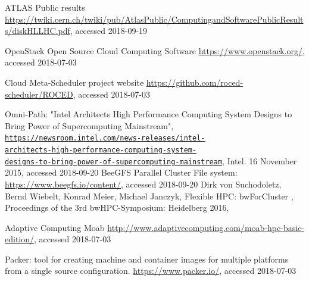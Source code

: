 
\begin{thebibliography}{}
%
%
  ATLAS Public results
  \url{https://twiki.cern.ch/twiki/pub/AtlasPublic/ComputingandSoftwarePublicResults/diskHLLHC.pdf},
  accessed 2018-09-19

OpenStack Open Source Cloud Computing Software
\url{https://www.openstack.org/}, accessed 2018-07-03

\Roced Cloud Meta-Scheduler project website
\url{https://github.com/roced-scheduler/ROCED}, accessed 2018-07-03

  Omni-Path:
"Intel Architects High Performance Computing System Designs to Bring
Power of Supercomputing Mainstream",
\texttt{\href{https://newsroom.intel.com/news-releases/intel-architects-high-performance-computing-system-designs-to-bring-power-of-supercomputing-mainstream/}{https://newsroom.intel.com/news-releases/intel-\\architects-high-performance-computing-system-\\designs-to-bring-power-of-supercomputing-mainstream}},
Intel. 16 November 2015, accessed 2018-09-20
BeeGFS Parallel Cluster File system:
\url{https://www.beegfs.io/content/}, accessed 2018-09-20
Dirk von Suchodoletz, Bernd Wiebelt, Konrad Meier, Michael Janczyk,
  Flexible HPC: bwForCluster \NEMO,
  Proceedings of the 3rd bwHPC-Symposium: Heidelberg 2016,




Adaptive Computing Moab
\url{http://www.adaptivecomputing.com/moab-hpc-basic-edition/}, accessed 2018-07-03

Packer: tool for creating machine and container images for multiple platforms from a single source configuration. 
\url{https://www.packer.io/}, accessed 2018-07-03


\end{thebibliography}
